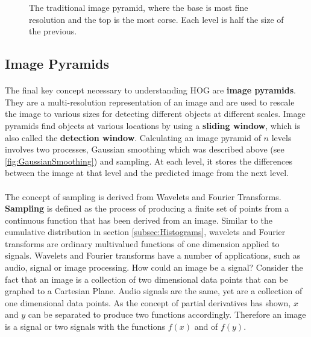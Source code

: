 \documentclass[11pt]{article}
\newcommand\simpleparagraph[1]{%
	\stepcounter{paragraph}\paragraph*{\theparagraph\quad{}#1}}
\renewcommand\theparagraph{}
\begin{document}
\begin{figure}[h]
	\centering
	\hfill
	\caption{The traditional image pyramid, where the base is most fine resolution and the top is the most corse. Each level is half the size of the previous.}
	\label{fig:ImagePyramid}%
\end{figure}
\subsection{Image Pyramids}
\simpleparagraph{}
The final key concept necessary to understanding HOG are \textbf{image pyramids}. They are a multi-resolution representation of an image and are used to rescale the image to various sizes for detecting different objects at different scales. Image pyramids find objects at various locations by using a \textbf{sliding window}, which is also called the \textbf{detection window}. Calculating an image pyramid of $n$ levels involves two processes, Gaussian smoothing which was described above (see \ref{fig:GaussianSmoothing}) and sampling. At each level, it stores the differences between the image at that level and the predicted image from the next level.%

\simpleparagraph{}
The concept of sampling is derived from Wavelets and Fourier Transforms. \textbf{Sampling} is defined as the process of producing a finite set of points from a continuous function that has been derived from an image. Similar to the cumulative distribution in section \ref{subsec:Histograms}, wavelets and Fourier transforms are ordinary multivalued functions of one dimension applied to signals. Wavelets and Fourier transforms have a number of applications, such as audio, signal or image processing. How could an image be a signal? Consider the fact that an image is a collection of two dimensional data points that can be graphed to a Cartesian Plane. Audio signals are the same, yet are a collection of one dimensional data points. As the concept of partial derivatives has shown, $x$ and $y$ can be separated to produce two functions accordingly. Therefore an image is a signal or two signals with the functions $f(x)$ and of $f(y)$.
\end{document}
